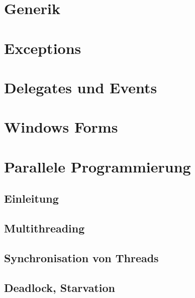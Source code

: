 \documentclass{scrreprt}
\begin{document}
\chapter{Generik}


\chapter{Exceptions}


\chapter{Delegates und Events}


\chapter{Windows Forms}




\chapter{Parallele Programmierung}
\section{Einleitung}

\section{Multithreading}

\section{Synchronisation von Threads}

\section{Deadlock, Starvation}

\end{document}
